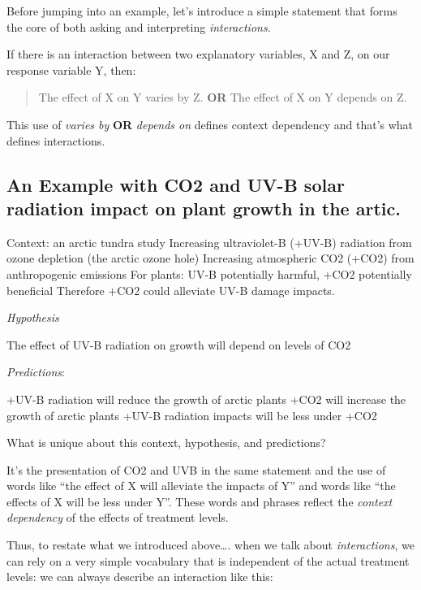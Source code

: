 \documentclass[
]{book}
\begin{document}
Before jumping into an example, let's introduce a simple statement that forms the core of both asking and interpreting \emph{interactions}.

If there is an interaction between two explanatory variables, X and Z, on our response variable Y, then:

\begin{quote}
The effect of X on Y varies by Z. \textbf{OR} The effect of X on Y depends on Z.
\end{quote}

This use of \emph{varies by} \textbf{OR} \emph{depends on} defines context dependency and that's what defines interactions.

\hypertarget{an-example-with-co2-and-uv-b-solar-radiation-impact-on-plant-growth-in-the-artic.}{%
\subsection{An Example with CO2 and UV-B solar radiation impact on plant growth in the artic.}\label{an-example-with-co2-and-uv-b-solar-radiation-impact-on-plant-growth-in-the-artic.}}

Context: an arctic tundra study
Increasing ultraviolet-B (+UV-B) radiation from ozone depletion (the arctic ozone hole)
Increasing atmospheric CO2 (+CO2) from anthropogenic emissions
For plants: UV-B potentially harmful, +CO2 potentially beneficial
Therefore +CO2 could alleviate UV-B damage impacts.

\emph{Hypothesis}

The effect of UV-B radiation on growth will depend on levels of CO2

\emph{Predictions}:

+UV-B radiation will reduce the growth of arctic plants
+CO2 will increase the growth of arctic plants
+UV-B radiation impacts will be less under +CO2

What is unique about this context, hypothesis, and predictions?

It's the presentation of CO2 and UVB in the same statement and the use of words like ``the effect of X will alleviate the impacts of Y'' and words like ``the effects of X will be less under Y''. These words and phrases reflect the \emph{context dependency} of the effects of treatment levels.

Thus, to restate what we introduced above\ldots. when we talk about \emph{interactions}, we can rely on a very simple vocabulary that is independent of the actual treatment levels: we can always describe an interaction like this:
\end{document}
